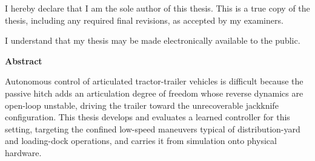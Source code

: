 \documentclass[12pt]{report}
\begin{document}
\noindent I hereby declare that I am the sole author of this thesis. This is a true copy of the
thesis, including any required final revisions, as accepted by my examiners.

\bigskip
\noindent I understand that my thesis may be made electronically available to the public.
\clearpage


\begin{center}\textbf{Abstract}\end{center}
\vspace{1em}

\noindent Autonomous control of articulated tractor-trailer vehicles is difficult because the passive hitch adds an articulation degree of freedom whose reverse dynamics are open-loop unstable, driving the trailer toward the unrecoverable jackknife configuration. This thesis develops and evaluates a learned controller for this setting, targeting the confined low-speed maneuvers typical of distribution-yard and loading-dock operations, and carries it from simulation onto physical hardware.
\end{document}
